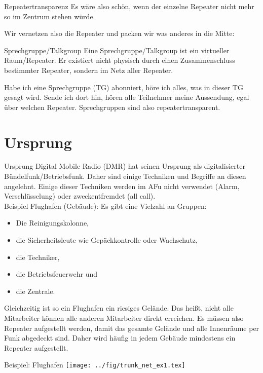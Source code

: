 \documentclass[aspectratio=169]{beamer}
\begin{document}
\begin{frame}{Repeatertransparenz}
Es wäre also schön, wenn der einzelne Repeater nicht mehr so im Zentrum stehen würde. 

\pause Wir vernetzen also die Repeater und packen wir was anderes in die Mitte:
\begin{block}{Sprechgruppe/Talkgroup}
 Eine Sprechgruppe/Talkgroup ist ein virtueller Raum/Repeater. Er existiert nicht physisch durch einen Zusammenschluss bestimmter Repeater, sondern im Netz aller Repeater. 
 
 Habe ich eine Sprechgruppe (TG) abonniert, höre ich alles, was in dieser TG gesagt wird. Sende ich dort hin, hören alle Teilnehmer meine Aussendung, egal über welchen Repeater. Sprechgruppen sind also repeatertransparent.
\end{block}
\end{frame}


\section{Ursprung}
\begin{frame}{Ursprung}
Digital Mobile Radio (DMR) hat seinen Ursprung als digitalisierter Bündelfunk/Betriebsfunk. Daher sind einige Techniken und Begriffe an diesen angelehnt. Einige dieser Techniken werden im AFu nicht verwendet (Alarm, Verschlüsselung) oder zweckentfremdet (all call).\\[0.2cm]

\pause Beispiel Flughafen (Gebäude): Es gibt eine Vielzahl an Gruppen:
\begin{itemize}
 \item Die Reinigungskolonne,
 \item die Sicherheitsleute wie Gepäckkontrolle oder Wachschutz,
 \item die Techniker,
 \item die Betriebsfeuerwehr und
 \item die Zentrale.
\end{itemize}
\pause Gleichzeitig ist so ein Flughafen ein riesiges Gelände. Das heißt, nicht alle Mitarbeiter können alle anderen Mitarbeiter direkt erreichen. Es müssen also Repeater aufgestellt werden, damit das gesamte Gelände und alle Innenräume per Funk abgedeckt sind. Daher wird häufig in jedem Gebäude mindestens ein Repeater aufgestellt. 
\end{frame}

\begin{frame}{Beispiel: Flughafen}
\centering
\texttt{[image: ../fig/trunk\_net\_ex1.tex]}
\end{frame}
\end{document}

